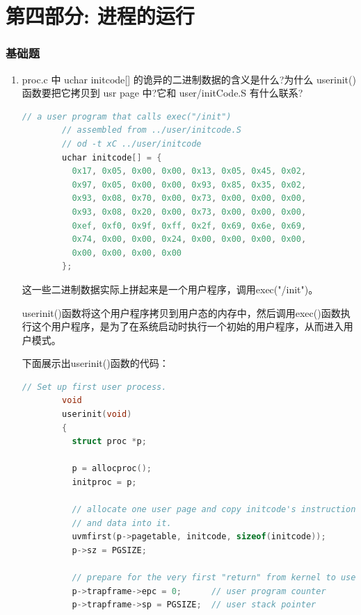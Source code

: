 \documentclass[UTF8]{article}
\begin{document}
\section{第四部分: 进程的运行}

\subsubsection{基础题}

\begin{enumerate}
    \item proc.c 中 uchar initcode[] 的诡异的二进制数据的含义是什么?为什么 userinit() 函数要把它拷⻉到 usr page 中?它和 user/initCode.S 有什么联系?
    
    \begin{lstlisting}[language=C]
        // a user program that calls exec("/init")
        // assembled from ../user/initcode.S
        // od -t xC ../user/initcode
        uchar initcode[] = {
          0x17, 0x05, 0x00, 0x00, 0x13, 0x05, 0x45, 0x02,
          0x97, 0x05, 0x00, 0x00, 0x93, 0x85, 0x35, 0x02,
          0x93, 0x08, 0x70, 0x00, 0x73, 0x00, 0x00, 0x00,
          0x93, 0x08, 0x20, 0x00, 0x73, 0x00, 0x00, 0x00,
          0xef, 0xf0, 0x9f, 0xff, 0x2f, 0x69, 0x6e, 0x69,
          0x74, 0x00, 0x00, 0x24, 0x00, 0x00, 0x00, 0x00,
          0x00, 0x00, 0x00, 0x00
        };        
    \end{lstlisting}
    
    这一些二进制数据实际上拼起来是一个用户程序，调用exec("/init")。
    
    userinit()函数将这个用户程序拷贝到用户态的内存中，然后调用exec()函数执行这个用户程序，是为了在系统启动时执行一个初始的用户程序，从而进入用户模式。
    
    下面展示出userinit()函数的代码：

    \begin{lstlisting}[language=C]
        // Set up first user process.
        void
        userinit(void)
        {
          struct proc *p;
        
          p = allocproc();
          initproc = p;
          
          // allocate one user page and copy initcode's instructions
          // and data into it.
          uvmfirst(p->pagetable, initcode, sizeof(initcode));
          p->sz = PGSIZE;
        
          // prepare for the very first "return" from kernel to user.
          p->trapframe->epc = 0;      // user program counter
          p->trapframe->sp = PGSIZE;  // user stack pointer
        

\end{lstlisting}
\end{enumerate}
\end{document}

